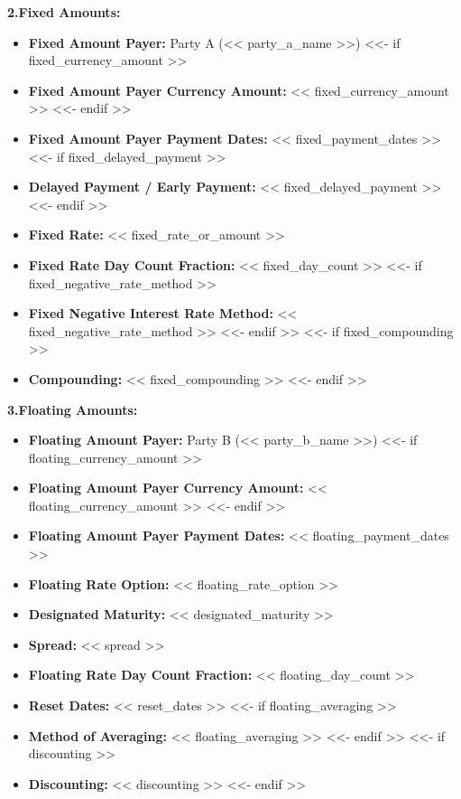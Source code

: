 \documentclass[11pt, a4paper]{article}
\begin{document}
\vspace{0.3cm}
\noindent \textbf{2.\quad Fixed Amounts:}
\begin{itemize}[leftmargin=2cm, label={}, itemsep=3pt]
    \item \textbf{Fixed Amount Payer:} Party A (<< party_a_name >>)
<<- if fixed_currency_amount >>
    \item \textbf{Fixed Amount Payer Currency Amount:} << fixed_currency_amount >>
<<- endif >>
    \item \textbf{Fixed Amount Payer Payment Dates:} << fixed_payment_dates >>
<<- if fixed_delayed_payment >>
    \item \textbf{Delayed Payment / Early Payment:} << fixed_delayed_payment >>
<<- endif >>
    \item \textbf{Fixed Rate:} << fixed_rate_or_amount >>
    \item \textbf{Fixed Rate Day Count Fraction:} << fixed_day_count >>
<<- if fixed_negative_rate_method >>
    \item \textbf{Fixed Negative Interest Rate Method:} << fixed_negative_rate_method >>
<<- endif >>
<<- if fixed_compounding >>
    \item \textbf{Compounding:} << fixed_compounding >>
<<- endif >>
\end{itemize}

\vspace{0.3cm}
\noindent \textbf{3.\quad Floating Amounts:}
\begin{itemize}[leftmargin=2cm, label={}, itemsep=3pt]
    \item \textbf{Floating Amount Payer:} Party B (<< party_b_name >>)
<<- if floating_currency_amount >>
    \item \textbf{Floating Amount Payer Currency Amount:} << floating_currency_amount >>
<<- endif >>
    \item \textbf{Floating Amount Payer Payment Dates:} << floating_payment_dates >>
    \item \textbf{Floating Rate Option:} << floating_rate_option >>
    \item \textbf{Designated Maturity:} << designated_maturity >>
    \item \textbf{Spread:} << spread >>
    \item \textbf{Floating Rate Day Count Fraction:} << floating_day_count >>
    \item \textbf{Reset Dates:} << reset_dates >>
<<- if floating_averaging >>
    \item \textbf{Method of Averaging:} << floating_averaging >>
<<- endif >>
<<- if discounting >>
    \item \textbf{Discounting:} << discounting >>
<<- endif >>
\end{itemize}
\end{document}
